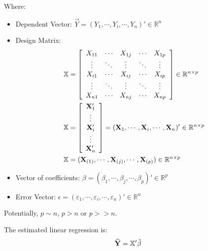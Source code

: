 Where:
\begin{itemize}
\item Dependent Vector: $\Vec{Y} = (Y_1, \cdots, Y_i, \cdots, Y_n)' \in \mathbb{R}^n$
\item Design Matrix: 
    \begin{align*}
        \mathbb{X} &= \left[
            \begin{array}{cccccc}
                X_{11} & \cdots & X_{1j} & \cdots & X_{1p} \\
                \vdots & \ddots & \vdots & \ddots & \vdots \\
                X_{i1} & \cdots & X_{ij} & \cdots & X_{ip} \\
                \vdots & \ddots & \vdots & \ddots & \vdots \\
                X_{n1} & \cdots & X_{nj} & \cdots & X_{np} \\
            \end{array}
        \right] \in \mathbb{R}^{n \times p}\\
        \mathbb{X} &= \left[
            \begin{array}{cccccc}
                \mathbf{X}_{1}' \\
                \vdots \\
                \mathbf{X}_{i}' \\
                \vdots \\
                \mathbf{X}_{n}' \\
            \end{array}
        \right] = (\mathbf{X}_1, \cdots, \mathbf{X}_i, \cdots, \mathbf{X}_n)' \in \mathbb{R}^{n \times p}\\
        \mathbb{X} &= (\mathbf{X}_{(1)}, \cdots, \mathbf{X}_{(j)}, \cdots, \mathbf{X}_{(p)}) \in \mathbb{R}^{n \times p}\\
    \end{align*}
\item Vector of coefficients: $\beta = (\beta_1, \cdots, \beta_j, \cdots, \beta_p)' \in \mathbb{R}^p$
\item Error Vector: $\epsilon = (\varepsilon_1, \cdots, \varepsilon_i, \cdots, \varepsilon_n)' \in \mathbb{R}^n$
\end{itemize}

Potentially, $p \sim n$, $p > n$ or $p >> n$.


The estimated linear regression is:
\begin{align*}
\widehat{\mathbf{Y}} = \mathbb{X}'\hat{\beta}
\end{align*}

